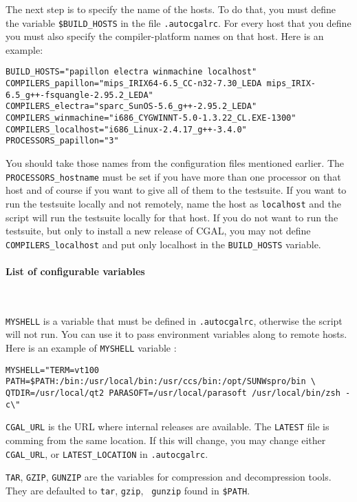 The next step is to specify the name of the hosts. To do that, you must define
the variable {\tt \$BUILD\_HOSTS} in the file {\tt .autocgalrc}. For every
host that you define you must also specify the compiler-platform names on that
host.  Here is an example:
{\small\begin{verbatim}
BUILD_HOSTS="papillon electra winmachine localhost"
COMPILERS_papillon="mips_IRIX64-6.5_CC-n32-7.30_LEDA mips_IRIX-6.5_g++-fsquangle-2.95.2_LEDA"
COMPILERS_electra="sparc_SunOS-5.6_g++-2.95.2_LEDA"
COMPILERS_winmachine="i686_CYGWINNT-5.0-1.3.22_CL.EXE-1300"
COMPILERS_localhost="i686_Linux-2.4.17_g++-3.4.0"
PROCESSORS_papillon="3"
\end{verbatim}}
You should take those names from the configuration files mentioned earlier.
The {\tt PROCESSORS\_hostname} must be set if you have more than one 
processor on that host and of course if you want to give all of them to the 
testsuite. If you want to run the testsuite locally and not remotely, name the 
host as {\tt localhost} and the script will run the testsuite locally for that
host. If you do not want to run the testsuite, but only to install a new release of CGAL, you may not define {\tt COMPILERS\_localhost} and put only localhost in the {\tt BUILD\_HOSTS} variable.

\paragraph{List of configurable variables} ~

{\tt MYSHELL} is a variable that must be defined in {\tt .autocgalrc},
otherwise the script will not run.  You can use it to pass environment
variables along to remote hosts.  Here is an example of {\tt MYSHELL}
variable :
\begin{verbatim}
MYSHELL="TERM=vt100 PATH=$PATH:/bin:/usr/local/bin:/usr/ccs/bin:/opt/SUNWspro/bin \
QTDIR=/usr/local/qt2 PARASOFT=/usr/local/parasoft /usr/local/bin/zsh -c\"
\end{verbatim}

{\tt CGAL\_URL} is the URL where internal releases are available.
The {\tt LATEST} file is comming from the same location. If this will change,
you may change either {\tt CGAL\_URL}, or {\tt LATEST\_LOCATION}
in {\tt .autocgalrc}.

{\tt TAR}, {\tt GZIP}, {\tt GUNZIP} are the variables for compression and
decompression tools.  They are defaulted to {\tt tar}, {\tt gzip}, {\tt
gunzip} found in {\tt \$PATH}.

